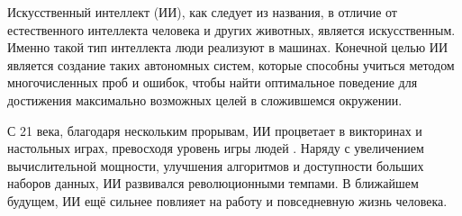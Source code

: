 Искусственный интеллект \cite{Crevier93} (ИИ), как следует из названия, в отличие от естественного интеллекта человека и других животных, является искусственным. Именно такой тип интеллекта люди реализуют в машинах.
Конечной целью ИИ является создание таких автономных систем, которые способны учиться методом многочисленных проб и ошибок, чтобы найти оптимальное поведение для достижения максимально возможных целей в сложившемся окружении. \cite{RussellAndNorvig-AI-modern-approach}

С 21 века, благодаря нескольким прорывам, ИИ процветает в викторинах и настольных играх, превосходя уровень игры людей \cite{Watson} \cite{AlphaGo}. Наряду с увеличением вычислительной мощности, улучшения алгоритмов и доступности больших наборов данных, ИИ развивался революционными темпами. В ближайшем будущем, ИИ ещё сильнее повлияет на работу и повседневную жизнь человека.





%
\newpage %

